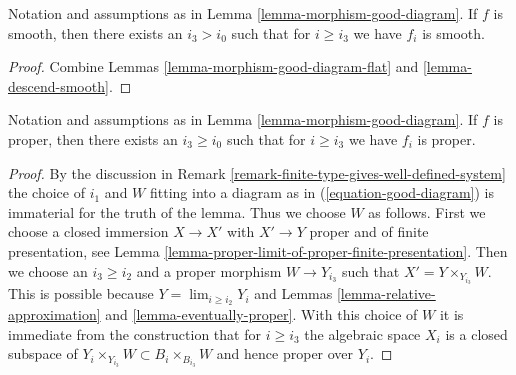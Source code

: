 \begin{lemma}
\label{lemma-morphism-good-diagram-smooth}
Notation and assumptions as in Lemma \ref{lemma-morphism-good-diagram}.
If $f$ is smooth, then there exists an $i_3 > i_0$ such that for
$i \geq i_3$ we have $f_i$ is smooth.
\end{lemma}

\begin{proof}
Combine Lemmas \ref{lemma-morphism-good-diagram-flat} and
\ref{lemma-descend-smooth}.
\end{proof}

\begin{lemma}
\label{lemma-morphism-good-diagram-proper}
Notation and assumptions as in Lemma \ref{lemma-morphism-good-diagram}.
If $f$ is proper, then there exists an $i_3 \geq i_0$ such that for
$i \geq i_3$ we have $f_i$ is proper.
\end{lemma}

\begin{proof}
By the discussion in 
Remark \ref{remark-finite-type-gives-well-defined-system}
the choice of $i_1$ and $W$ fitting into a diagram as in
(\ref{equation-good-diagram}) is immaterial for the truth of
the lemma. Thus we choose $W$ as follows.
First we choose a closed immersion $X \to X'$
with $X' \to Y$ proper and of finite presentation, see
Lemma \ref{lemma-proper-limit-of-proper-finite-presentation}.
Then we choose an $i_3 \geq i_2$ and a proper morphism $W \to Y_{i_3}$
such that $X' = Y \times_{Y_{i_3}} W$. This is possible because
$Y = \lim_{i \geq i_2} Y_i$ and
Lemmas \ref{lemma-relative-approximation} and \ref{lemma-eventually-proper}.
With this choice of $W$ it is immediate from the construction that
for $i \geq i_3$ the algebraic space $X_i$ is a closed subspace of
$Y_i \times_{Y_{i_3}} W \subset B_i \times_{B_{i_3}} W$
and hence proper over $Y_i$.
\end{proof}

